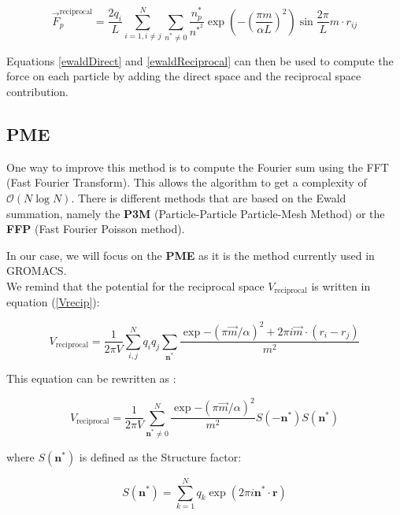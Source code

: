 \documentclass[11pt,twoside,a4paper]{report}
\begin{document}
\begin{equation}
\label{ewaldReciprocal}
   \overrightarrow{F}_p^{\text{reciprocal}} = \frac{2 q_i}{L} \sum\limits_{i=1,i\neq j}^N \sum_{n^* \neq 0} \frac{n_p^*}{n^{*^2}} \exp{(-(\frac{\pi m}{\alpha L})^2)}\sin{\frac{2\pi}{L} m \cdot r_{ij} }
\end{equation}

Equations \ref{ewaldDirect} and \ref{ewaldReciprocal} can then be used to compute the force on each particle by adding the direct space and the reciprocal space contribution.\\


\subsection{PME}

One way to improve this method is to compute the Fourier sum using the FFT (Fast Fourier Transform). This allows the algorithm to get a complexity of $\mathcal{O}(N\log N)$. There is different methods that are based on the Ewald summation, namely the \textbf{P3M} (Particle-Particle Particle-Mesh Method) or the \textbf{FFP} (Fast Fourier Poisson method). 

In our case, we will focus on the \textbf{PME} as it is the method currently used in GROMACS. \\

We remind that the potential for the reciprocal space $V_{\text{reciprocal}}$ is written in equation (\ref{Vrecip}):


\begin{equation*}
    V_{\text{reciprocal}} =\frac{1}{2 \pi V} \sum\limits_{i,j}^{N} q_i q_j \sum\limits_{\textbf{n}^*} \frac{\exp{-(\pi \overrightarrow{m}/\alpha)^2} +2\pi i \overrightarrow{m} \cdot (r_i - r_j)}{m^2}    
\end{equation*}



This equation can be rewritten as :

\begin{equation*}
    V_{\text{reciprocal}} =\frac{1}{2 \pi V} \sum\limits_{\textbf{n}^* \neq 0}^{N}  \frac{\exp{-(\pi \overrightarrow{m}/\alpha)^2}}{m^2}S(-\textbf{n}^* )S(\textbf{n}^* )
\end{equation*}

where $S(\textbf{n}^* )$ is defined as the Structure factor:

\begin{equation}
    S(\textbf{n}^* ) = \sum\limits_{k=1}^{N} {q_k \exp(2 \pi i \textbf{n}^* \cdot \textbf{r}) }
\end{equation}
\end{document}

